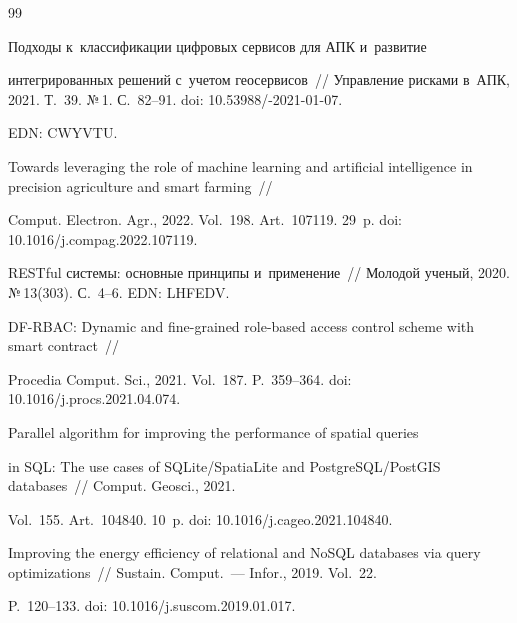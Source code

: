 {{\begin{thebibliography}{99}

 Подходы к~классификации цифровых сервисов для АПК и~развитие 

интегрированных решений с~учетом геосервисов~/\!\!/ Управление рисками в~АПК, 2021. Т.~39. №\,1. С.~82--91. doi: 10.53988\!/-2021-01-07.

 EDN: CWYVTU.


 Towards leveraging the role of machine learning and artificial intelligence in precision agriculture and smart farming~/\!\!/ 

Comput. Electron. Agr., 2022. Vol.~198. Art.~107119. 29~p. doi: 10.1016\!/\!j.compag.2022.107119.


 RESTful сис\-те\-мы: основные принципы и~применение~/\!\!/ Молодой ученый, 2020. №\,13(303). С.~4--6. EDN: LHFEDV.


 DF-RBAC: Dynamic and fine-grained role-based access control scheme with smart contract~/\!\!/ 

Procedia Comput. Sci., 2021. Vol.~187. P.~359--364. doi: 10.1016/j.procs.2021.04.074.


 Parallel algorithm for improving the performance of spatial queries 

in SQL: The use cases of SQLite/SpatiaLite and PostgreSQL/PostGIS databases~/\!\!/ Comput. Geosci., 2021. 

Vol.~155. Art.~104840. 10~p. doi: 10.1016\!\!/j.cageo.2021.104840.



Improving the energy efficiency of relational and NoSQL databases via query optimizations~/\!\!/ Sustain. Comput.~--- Infor., 2019. Vol.~22. 

P.~120--133. doi: 10.1016\!/\!j.suscom.2019.01.017.

     \end{thebibliography}

} }







